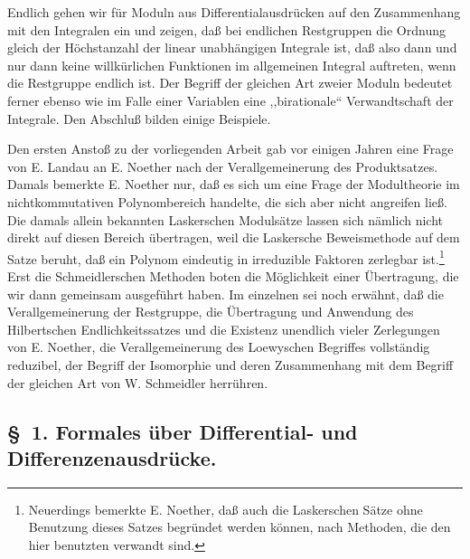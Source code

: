 \documentclass[11pt]{article}
\begin{document}
Endlich gehen wir für Moduln aus Differentialausdrücken auf den Zusammenhang mit den Integralen ein und zeigen, daß bei endlichen Restgruppen die Ordnung gleich der Höchstanzahl der linear unabhängigen Integrale ist, daß also dann und nur dann keine willkürlichen Funktionen im allgemeinen Integral auftreten, wenn die Restgruppe endlich ist. Der Begriff der gleichen Art zweier Moduln bedeutet ferner ebenso wie im Falle einer Variablen eine ,,birationale`` Verwandtschaft der Integrale. Den Abschluß bilden einige Beispiele.

Den ersten Anstoß zu der vorliegenden Arbeit gab vor einigen Jahren eine Frage von E. Landau an E. Noether nach der Verallgemeinerung des Produktsatzes. Damals bemerkte E. Noether nur, daß es sich um eine Frage der Modultheorie im nichtkommutativen Polynombereich handelte, die sich aber nicht angreifen ließ. Die damals allein bekannten Laskerschen Modulsätze lassen sich nämlich nicht direkt auf diesen Bereich übertragen, weil die Laskersche Beweismethode auf dem Satze beruht, daß ein Polynom eindeutig in irreduzible Faktoren zerlegbar ist.\footnote{Neuerdings bemerkte E. Noether, daß auch die Laskerschen Sätze ohne Benutzung dieses Satzes begründet werden können, nach Methoden, die den hier benutzten verwandt sind.} Erst die Schmeidlerschen Methoden boten die Möglichkeit einer Übertragung, die wir dann gemeinsam ausgeführt haben. Im einzelnen sei noch erwähnt, daß die Verallgemeinerung der Restgruppe, die Übertragung und Anwendung des Hilbertschen Endlichkeitssatzes und die Existenz unendlich vieler Zerlegungen von E. Noether, die Verallgemeinerung des Loewyschen Begriffes vollständig reduzibel, der Begriff der Isomorphie und deren Zusammenhang mit dem Begriff der gleichen Art von W. Schmeidler herrühren.

\subsection*{\S~1. Formales über Differential- und Differenzenausdrücke.}
\end{document}
